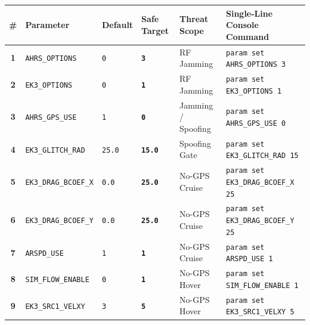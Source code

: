 \documentclass[10pt,letterpaper]{article}
\begin{document}
\vspace{1.5mm}
\noindent
\footnotesize
\renewcommand{\arraystretch}{1.2}
\begin{tabularx}{\textwidth}{c L{0.22\textwidth} C{0.08\textwidth} C{0.09\textwidth} L{0.18\textwidth} Y}
\toprule
{}
\textbf{\#} & \textbf{Parameter} & \textbf{Default} & \textbf{Safe Target} & \textbf{Threat Scope} & \textbf{Single-Line Console Command} \\
\midrule
\textbf{1} & \texttt{AHRS\_OPTIONS} & \texttt{0} & \texttt{\bfseries 3} & RF Jamming & \texttt{\small\color{cmdgreen}param set AHRS\_OPTIONS 3} \\
\textbf{2} & \texttt{EK3\_OPTIONS} & \texttt{0} & \texttt{\bfseries 1} & RF Jamming & \texttt{\small\color{cmdgreen}param set EK3\_OPTIONS 1} \\
\textbf{3} & \texttt{AHRS\_GPS\_USE} & \texttt{1} & \texttt{\bfseries 0} & Jamming / Spoofing & \texttt{\small\color{cmdgreen}param set AHRS\_GPS\_USE 0} \\
\textbf{4} & \texttt{EK3\_GLITCH\_RAD} & \texttt{25.0} & \texttt{\bfseries 15.0} & Spoofing Gate & \texttt{\small\color{cmdgreen}param set EK3\_GLITCH\_RAD 15} \\
\textbf{5} & \texttt{EK3\_DRAG\_BCOEF\_X} & \texttt{0.0} & \texttt{\bfseries 25.0} & No-GPS Cruise & \texttt{\small\color{cmdgreen}param set EK3\_DRAG\_BCOEF\_X 25} \\
\textbf{6} & \texttt{EK3\_DRAG\_BCOEF\_Y} & \texttt{0.0} & \texttt{\bfseries 25.0} & No-GPS Cruise & \texttt{\small\color{cmdgreen}param set EK3\_DRAG\_BCOEF\_Y 25} \\
\textbf{7} & \texttt{ARSPD\_USE} & \texttt{1} & \texttt{\bfseries 1} & No-GPS Cruise & \texttt{\small\color{cmdgreen}param set ARSPD\_USE 1} \\
\textbf{8} & \texttt{SIM\_FLOW\_ENABLE} & \texttt{0} & \texttt{\bfseries 1} & No-GPS Hover & \texttt{\small\color{cmdgreen}param set SIM\_FLOW\_ENABLE 1} \\
\textbf{9} & \texttt{EK3\_SRC1\_VELXY} & \texttt{3} & \texttt{\bfseries 5} & No-GPS Hover & \texttt{\small\color{cmdgreen}param set EK3\_SRC1\_VELXY 5} \\
\bottomrule
\end{tabularx}
\end{document}

